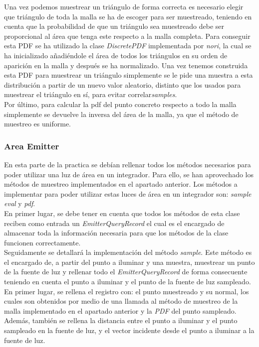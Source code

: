 \documentclass[10pt,oneside,a4paper]{article}
\begin{document}
Una vez podemos muestrear un triángulo de forma correcta es necesario elegir que triángulo de toda la malla se ha de escoger para ser muestreado, teniendo en cuenta que la probabilidad de que un triángulo sea muestreado debe ser proporcional al área que tenga este respecto a la malla completa. Para conseguir esta PDF se ha utilizado la clase \textit{DiscretePDF} implementada por \textit{nori}, la cual se ha inicializado añadiéndole el área de todos los triángulos en su orden de aparición en la malla y después se ha normalizado. Una vez tenemos construida esta PDF para muestrear un triángulo simplemente se le pide una muestra a esta distribución a partir de un nuevo valor aleatorio, distinto que los usados para muestrear el triángulo en sí, para evitar correlar\textit{samples}.\\

Por último, para calcular la pdf del punto concreto respecto a todo la malla simplemente se devuelve la inversa del área de la malla, ya que el método de muestreo es uniforme.
\subsubsection{Area Emitter}
En esta parte de la practica se debían rellenar todos los métodos necesarios para poder utilizar una luz de área en un integrador. Para ello, se han aprovechado los métodos de muestreo implementados en el apartado anterior. Los  métodos a implementar para poder utilizar estas luces de área en un integrador son: \textit{sample} \textit{eval} y \textit{pdf}.\\

En primer lugar, se debe tener en cuenta que todos los métodos de esta clase reciben como entrada un \textit{EmitterQueryRecord} el cual es el encargado de almacenar toda la información necesaria para que los métodos de la clase funcionen correctamente.\\

Seguidamente se detallará la implementación del método \textit{sample}. Este método es el encargado de, a partir del punto a iluminar y una muestra, muestrear un punto de la fuente de luz y rellenar todo el \textit{EmitterQueryRecord} de forma consecuente teniendo en cuenta el punto a iluminar y el punto de la fuente de luz sampleado. En primer lugar, se rellena el registro con: el punto muestreado y su normal, los cuales son obtenidos por medio de una llamada al método de muestreo de la malla implementado en el apartado anterior y la \textit{PDF} del punto sampleado. Además, también se rellena la distancia entre el punto a iluminar y el punto sampleado en la fuente de luz, y el vector incidente desde el punto a iluminar a la fuente de luz.\\
\end{document}
